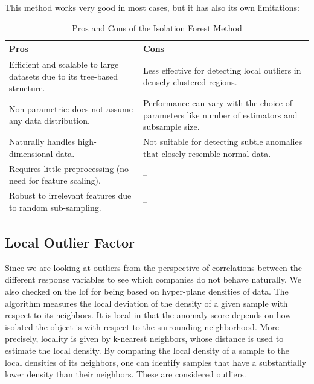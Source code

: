 \documentclass[11pt,english,a4paper,hidelinks]{book}
\begin{document}
\noindent This method works very good in most cases, but it has also its own limitations:

\begin{table}[H]
    \centering
    \begin{tabular}{p{7cm}p{7cm}}
    \toprule
    \textbf{Pros} & \textbf{Cons} \\
    \midrule
    Efficient and scalable to large datasets due to its tree-based structure. & Less effective for detecting local outliers in densely clustered regions. \\
    Non-parametric: does not assume any data distribution. & Performance can vary with the choice of parameters like number of estimators and subsample size. \\
    \hline
    Naturally handles high-dimensional data. & Not suitable for detecting subtle anomalies that closely resemble normal data. \\
    \hline
    Requires little preprocessing (no need for feature scaling). & -- \\
    \hline
    Robust to irrelevant features due to random sub-sampling. & -- \\
    \hline
    \end{tabular}
    \caption{Pros and Cons of the Isolation Forest Method }
\end{table}

\subsection{Local Outlier Factor}

Since we are looking at outliers from the perspective of correlations between the different response variables to see which companies do not behave naturally. We also checked on the \gls{lof} for being based on hyper-plane densities of data. The algorithm measures the local deviation of the density of a given sample with respect to its neighbors. It is local in that the anomaly score depends on how isolated the object is with respect to the surrounding neighborhood. More precisely, locality is given by k-nearest neighbors, whose distance is used to estimate the local density. By comparing the local density of a sample to the local densities of its neighbors, one can identify samples that have a substantially lower density than their neighbors. These are considered outliers. \cite{breunig2000lof}
\end{document}
